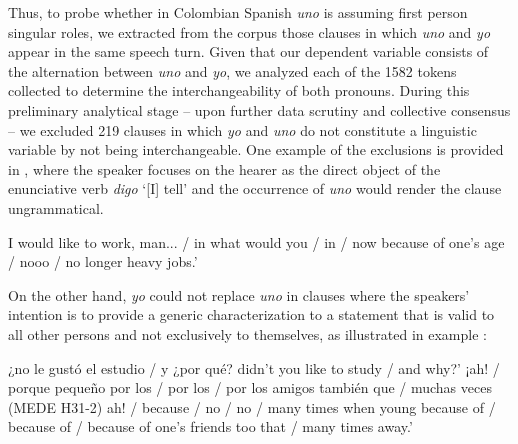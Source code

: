 \documentclass[output=paper]{langscibook}
\begin{document}
Thus, to probe whether in Colombian Spanish \textit{uno} is assuming first person singular roles, we extracted from the corpus those clauses in which \textit{uno} and \textit{yo} appear in the same speech turn. Given that our dependent variable consists of the alternation between \textit{uno} and \textit{yo}, we analyzed each of the 1582 tokens collected to determine the interchangeability of both pronouns. During this preliminary analytical stage – upon further data scrutiny and collective consensus – we excluded 219 clauses in which \textit{yo} and \textit{uno} do not constitute a linguistic variable by not being interchangeable. One example of the exclusions is provided in , where the speaker focuses on the hearer as the direct object of the enunciative verb \textit{digo} ‘[I] tell’ and the occurrence of \textit{uno} would render the clause ungrammatical.


\eanoraggedright\label{ex:orozco:10}
\begin{xlist}[‘E.:]
 I would like to work, man... / in what would \ExHighlight{[I]}  you / in / now because of one’s age / nooo /   no longer  heavy jobs.’
\end{xlist}
\z 

On the other hand, \textit{yo} could not replace \textit{uno} in clauses where the speakers’ intention is to provide a generic characterization to a statement that is valid to all other persons and not exclusively to themselves, as illustrated in example :


\eanoraggedright\label{ex:orozco:11}
\begin{xlist}[‘E.:]
 ¿no le gustó el estudio / y ¿por qué?
 didn't you like to study / and why?’
 ¡ah! / porque    {pequeño por los / por los / por los amigos también que / muchas veces}  (MEDE H31{}-2)
 ah! / because    / no / no / many times when   young because of / because of / because of one’s friends too that / many times    away.’
\end{xlist}
\z 
\end{document}
